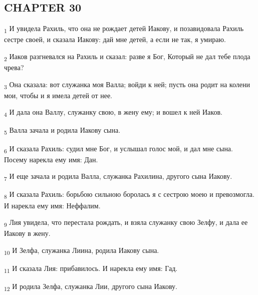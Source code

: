 \subsection{CHAPTER 30}
\begin{tcolorbox}
\textsubscript{1} И увидела Рахиль, что она не рождает детей Иакову, и позавидовала Рахиль сестре своей, и сказала Иакову: дай мне детей, а если не так, я умираю.
\end{tcolorbox}
\begin{tcolorbox}
\textsubscript{2} Иаков разгневался на Рахиль и сказал: разве я Бог, Который не дал тебе плода чрева?
\end{tcolorbox}
\begin{tcolorbox}
\textsubscript{3} Она сказала: вот служанка моя Валла; войди к ней; пусть она родит на колени мои, чтобы и я имела детей от нее.
\end{tcolorbox}
\begin{tcolorbox}
\textsubscript{4} И дала она Валлу, служанку свою, в жену ему; и вошел к ней Иаков.
\end{tcolorbox}
\begin{tcolorbox}
\textsubscript{5} Валла зачала и родила Иакову сына.
\end{tcolorbox}
\begin{tcolorbox}
\textsubscript{6} И сказала Рахиль: судил мне Бог, и услышал голос мой, и дал мне сына. Посему нарекла ему имя: Дан.
\end{tcolorbox}
\begin{tcolorbox}
\textsubscript{7} И еще зачала и родила Валла, служанка Рахилина, другого сына Иакову.
\end{tcolorbox}
\begin{tcolorbox}
\textsubscript{8} И сказала Рахиль: борьбою сильною боролась я с сестрою моею и превозмогла. И нарекла ему имя: Неффалим.
\end{tcolorbox}
\begin{tcolorbox}
\textsubscript{9} Лия увидела, что перестала рождать, и взяла служанку свою Зелфу, и дала ее Иакову в жену.
\end{tcolorbox}
\begin{tcolorbox}
\textsubscript{10} И Зелфа, служанка Лиина, родила Иакову сына.
\end{tcolorbox}
\begin{tcolorbox}
\textsubscript{11} И сказала Лия: прибавилось. И нарекла ему имя: Гад.
\end{tcolorbox}
\begin{tcolorbox}
\textsubscript{12} И родила Зелфа, служанка Лии, другого сына Иакову.
\end{tcolorbox}
